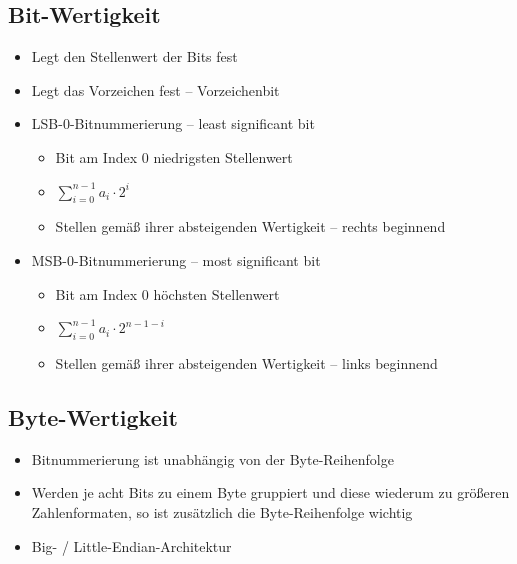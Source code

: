 \documentclass[xcolor=dvipsnames]{beamer}
\begin{document}
\subsection{Bit-Wertigkeit}
\begin{frame}
\begin{itemize}
	\item Legt den Stellenwert der Bits fest
	\item Legt das Vorzeichen fest -- Vorzeichenbit
	\item LSB-0-Bitnummerierung -- least significant bit
	\begin{itemize}
		\item Bit am Index 0 niedrigsten Stellenwert
		\item $\sum_{i=0}^{n-1} a_i \cdot 2^i$
		\item Stellen gemäß ihrer absteigenden Wertigkeit -- rechts beginnend
	\end{itemize}
	\item MSB-0-Bitnummerierung -- most significant bit
	\begin{itemize}
		\item Bit am Index 0 höchsten Stellenwert
		\item $\sum_{i=0}^{n-1} a_i \cdot 2^{n-1-i}$
		\item Stellen gemäß ihrer absteigenden Wertigkeit -- links beginnend
	\end{itemize}
\end{itemize}
\end{frame}

\subsection{Byte-Wertigkeit}
\begin{frame}
\begin{itemize}
	\item Bitnummerierung ist unabhängig von der Byte-Reihenfolge 
	\item Werden je acht Bits zu einem Byte gruppiert und diese wiederum zu größeren Zahlenformaten, so ist zusätzlich die Byte-Reihenfolge wichtig
	\item Big- / Little-Endian-Architektur
\end{itemize}
\end{frame}
\end{document}
